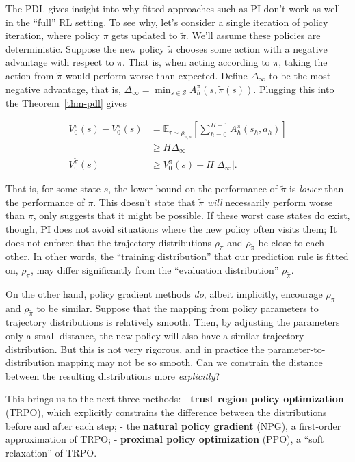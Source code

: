 \documentclass[
  letterpaper,
  DIV=11,
  numbers=noendperiod]{scrreprt}
\theoremstyle{plain}
\theoremstyle{plain}
\theoremstyle{definition}
\theoremstyle{definition}
\theoremstyle{remark}
\begin{document}
The PDL gives insight into why fitted approaches such as PI don't work
as well in the ``full'' RL setting. To see why, let's consider a single
iteration of policy iteration, where policy \(\pi\) gets updated to
\(\tilde \pi\). We'll assume these policies are deterministic. Suppose
the new policy \(\tilde \pi\) chooses some action with a negative
advantage with respect to \(\pi\). That is, when acting according to
\(\pi\), taking the action from \(\tilde \pi\) would perform worse than
expected. Define \(\Delta_\infty\) to be the most negative advantage,
that is,
\(\Delta_\infty = \min_{s \in \mathcal{S}} A^{\pi}_h(s, \tilde \pi(s))\).
Plugging this into the Theorem~\ref{thm-pdl} gives

\[
\begin{aligned}
V_0^{\tilde \pi}(s) - V_0^{\pi}(s) &= \mathbb{E}_{\tau \sim \rho_{\tilde \pi, s}} \left[
\sum_{h=0}^{H-1} A_h^{\pi}(s_h, a_h)
\right] \\
&\ge H \Delta_\infty \\
V_0^{\tilde \pi}(s) &\ge V_0^{\pi}(s) - H|\Delta_\infty|.
\end{aligned}
\]

That is, for some state \(s\), the lower bound on the performance of
\(\tilde \pi\) is \emph{lower} than the performance of \(\pi\). This
doesn't state that \(\tilde \pi\) \emph{will} necessarily perform worse
than \(\pi\), only suggests that it might be possible. If these worst
case states do exist, though, PI does not avoid situations where the new
policy often visits them; It does not enforce that the trajectory
distributions \(\rho_\pi\) and \(\rho_{\tilde \pi}\) be close to each
other. In other words, the ``training distribution'' that our prediction
rule is fitted on, \(\rho_\pi\), may differ significantly from the
``evaluation distribution'' \(\rho_{\tilde \pi}\).

On the other hand, policy gradient methods \emph{do}, albeit implicitly,
encourage \(\rho_\pi\) and \(\rho_{\tilde \pi}\) to be similar. Suppose
that the mapping from policy parameters to trajectory distributions is
relatively smooth. Then, by adjusting the parameters only a small
distance, the new policy will also have a similar trajectory
distribution. But this is not very rigorous, and in practice the
parameter-to-distribution mapping may not be so smooth. Can we constrain
the distance between the resulting distributions more \emph{explicitly}?

This brings us to the next three methods: - \textbf{trust region policy
optimization} (TRPO), which explicitly constrains the difference between
the distributions before and after each step; - the \textbf{natural
policy gradient} (NPG), a first-order approximation of TRPO; -
\textbf{proximal policy optimization} (PPO), a ``soft relaxation'' of
TRPO.
\end{document}
